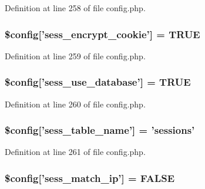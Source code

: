 Definition at line 258 of file config.\-php.

\hypertarget{application_2config_2config_8php_aed8943fa55fc74e62b540e8638c03038}{
\subsubsection[{\$config}]{\setlength{\rightskip}{0pt plus 5cm}\$config\mbox{[}'sess\-\_\-encrypt\-\_\-cookie'\mbox{]} = T\-R\-U\-E}}\label{application_2config_2config_8php_aed8943fa55fc74e62b540e8638c03038}


Definition at line 259 of file config.\-php.

\hypertarget{application_2config_2config_8php_ae320549e749a21903b685e363820370a}{
\subsubsection[{\$config}]{\setlength{\rightskip}{0pt plus 5cm}\$config\mbox{[}'sess\-\_\-use\-\_\-database'\mbox{]} = T\-R\-U\-E}}\label{application_2config_2config_8php_ae320549e749a21903b685e363820370a}


Definition at line 260 of file config.\-php.

\hypertarget{application_2config_2config_8php_ab65a6c6a4a0f2339707a4c20c44bf16b}{
\subsubsection[{\$config}]{\setlength{\rightskip}{0pt plus 5cm}\$config\mbox{[}'sess\-\_\-table\-\_\-name'\mbox{]} = 'sessions'}}\label{application_2config_2config_8php_ab65a6c6a4a0f2339707a4c20c44bf16b}


Definition at line 261 of file config.\-php.

\hypertarget{application_2config_2config_8php_aed449d12f2854249e5f7229fafb269b2}{
\subsubsection[{\$config}]{\setlength{\rightskip}{0pt plus 5cm}\$config\mbox{[}'sess\-\_\-match\-\_\-ip'\mbox{]} = F\-A\-L\-S\-E}}\label{application_2config_2config_8php_aed449d12f2854249e5f7229fafb269b2}


